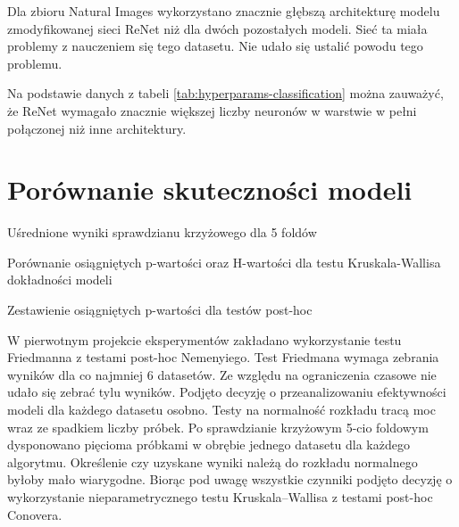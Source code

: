 \documentclass[oneside, mag]{mgr}
\begin{document}
Dla zbioru Natural Images wykorzystano znacznie głębszą architekturę modelu zmodyfikowanej sieci ReNet niż dla dwóch pozostałych modeli. Sieć ta miała problemy z nauczeniem się tego datasetu. Nie udało się ustalić powodu tego problemu.

Na podstawie danych z tabeli \ref{tab:hyperparams-classification} można zauważyć, że ReNet wymagało znacznie większej liczby neuronów w warstwie w pełni połączonej niż inne architektury.

\section{Porównanie skuteczności modeli}

\begin{table}[ht]
    \centering
    \caption{Uśrednione wyniki sprawdzianu krzyżowego dla 5 foldów}
    
    \label{table:cross_validation}
\end{table}

\begin{table}[ht]
    \centering
    \caption{Porównanie osiągniętych p-wartości oraz H-wartości dla testu Kruskala-Wallisa dokładności modeli}
    
    \label{table:kruskal}
\end{table}

\begin{table}[ht]
    \centering
    \caption{Zestawienie osiągniętych p-wartości dla testów post-hoc}
    
    \label{table:posthoc}
\end{table}

W pierwotnym projekcie eksperymentów zakładano wykorzystanie testu Friedmanna z testami post-hoc Nemenyiego. Test Friedmana wymaga zebrania wyników dla co najmniej 6 datasetów. Ze względu na ograniczenia czasowe nie udało się zebrać tylu wyników. Podjęto decyzję o przeanalizowaniu efektywności modeli dla każdego datasetu osobno. Testy na normalność rozkładu tracą moc wraz ze spadkiem liczby próbek. Po sprawdzianie krzyżowym 5-cio foldowym dysponowano pięcioma próbkami w obrębie jednego datasetu dla każdego algorytmu. Określenie czy uzyskane wyniki należą do rozkładu normalnego byłoby mało wiarygodne. Biorąc pod uwagę wszystkie czynniki podjęto decyzję o wykorzystanie nieparametrycznego testu Kruskala–Wallisa z testami post-hoc Conovera. 
\end{document}
